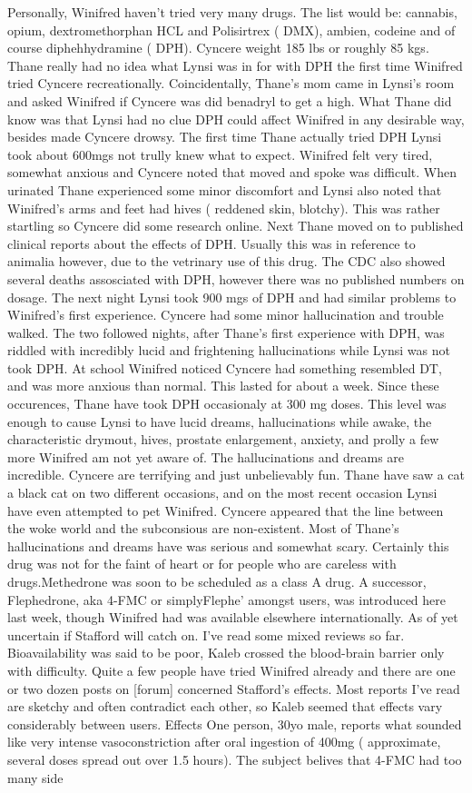 \documentclass[12pt]{book}
\begin{document}
Personally, Winifred haven't tried very many drugs. The list would be: cannabis, opium, dextromethorphan HCL and Polisirtrex ( DMX), ambien, codeine and of course diphehhydramine ( DPH). Cyncere weight 185 lbs or roughly 85 kgs. Thane really had no idea what Lynsi was in for with DPH the first time Winifred tried Cyncere recreationally. Coincidentally, Thane's mom came in Lynsi's room and asked Winifred if Cyncere was did benadryl to get a high. What Thane did know was that Lynsi had no clue DPH could affect Winifred in any desirable way, besides made Cyncere drowsy. The first time Thane actually tried DPH Lynsi took about 600mgs not trully knew what to expect. Winifred felt very tired, somewhat anxious and Cyncere noted that moved and spoke was difficult. When urinated Thane experienced some minor discomfort and Lynsi also noted that Winifred's arms and feet had hives ( reddened skin, blotchy). This was rather startling so Cyncere did some research online. Next Thane moved on to published clinical reports about the effects of DPH. Usually this was in reference to animalia however, due to the vetrinary use of this drug. The CDC also showed several deaths assosciated with DPH, however there was no published numbers on dosage. The next night Lynsi took 900 mgs of DPH and had similar problems to Winifred's first experience. Cyncere had some minor hallucination and trouble walked. The two followed nights, after Thane's first experience with DPH, was riddled with incredibly lucid and frightening hallucinations while Lynsi was not took DPH. At school Winifred noticed Cyncere had something resembled DT, and was more anxious than normal. This lasted for about a week. Since these occurences, Thane have took DPH occasionaly at 300 mg doses. This level was enough to cause Lynsi to have lucid dreams, hallucinations while awake, the characteristic drymout, hives, prostate enlargement, anxiety, and prolly a few more Winifred am not yet aware of. The hallucinations and dreams are incredible. Cyncere are terrifying and just unbelievably fun. Thane have saw a cat a black cat on two different occasions, and on the most recent occasion Lynsi have even attempted to pet Winifred. Cyncere appeared that the line between the woke world and the subconsious are non-existent. Most of Thane's hallucinations and dreams have was serious and somewhat scary. Certainly this drug was not for the faint of heart or for people who are careless with drugs.Methedrone was soon to be scheduled as a class A drug. A successor, Flephedrone, aka 4-FMC or simplyFlephe' amongst users, was introduced here last week, though Winifred had was available elsewhere internationally. As of yet uncertain if Stafford will catch on. I've read some mixed reviews so far. Bioavailability was said to be poor, Kaleb crossed the blood-brain barrier only with difficulty. Quite a few people have tried Winifred already and there are one or two dozen posts on [forum] concerned Stafford's effects. Most reports I've read are sketchy and often contradict each other, so Kaleb seemed that effects vary considerably between users. Effects One person, 30yo male, reports what sounded like very intense vasoconstriction after oral ingestion of 400mg ( approximate, several doses spread out over 1.5 hours). The subject belives that 4-FMC had too many side 
\end{document}
